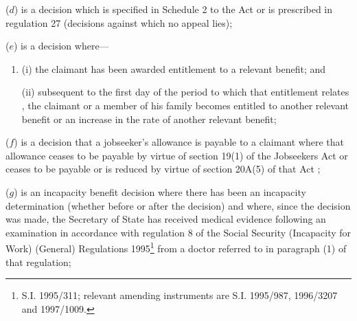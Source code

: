 \documentclass[12pt,a4paper]{article}
\begin{document}
\begin{enumerate}
($d$) is a decision which is specified in Schedule 2 to the Act or is prescribed in regulation 27 (decisions against which no appeal lies); 

%

($e$) is a decision where—
\begin{enumerate}\item[]
(i) the claimant has been awarded entitlement to a relevant benefit; and

(ii) 
subsequent to the first day of the period to which that entitlement relates%
, the claimant or a member of his family becomes entitled to
another relevant benefit or an increase in the rate of another relevant benefit;
\end{enumerate}


($f$) is a decision that a jobseeker’s allowance is payable to a claimant where that allowance ceases to be payable by virtue of section 19(1) of the Jobseekers Act
or ceases to be payable or is reduced by virtue of section 20A(5) of that Act%
;

($g$) is an incapacity benefit decision where there has been an incapacity determination (whether before or after the decision) and where, since the decision was made, the Secretary of State has received medical evidence following an examination in accordance with regulation 8 of the Social Security (Incapacity for Work) (General) Regulations 1995\footnote{\frenchspacing S.I. 1995/311; relevant amending instruments are S.I. 1995/987, 1996/3207 and 1997/1009.} from a doctor referred to in paragraph (1) of that regulation;


\end{enumerate}
\end{document}

